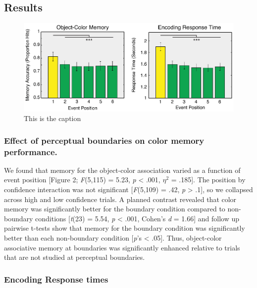 \subsection{Results}\label{results}

\begin{figure}[htbp]
\centering
\includegraphics{figures/chapter1_figure2}
\caption{This is the caption}
\end{figure}

\subsubsection{Effect of perceptual boundaries on color memory
performance.}\label{effect-of-perceptual-boundaries-on-color-memory-performance.}

We found that memory for the object-color association varied as a
function of event position {[}Figure 2; \emph{F}(5,115) = 5.23, \emph{p}
\textless{} .001, \(\eta^{2}\) = .185{]}. The position by confidence
interaction was not significant {[}\emph{F}(5,109) = .42, \emph{p}
\textgreater{} .1{]}, so we collapsed across high and low confidence
trials. A planned contrast revealed that color memory was significantly
better for the boundary condition compared to non-boundary conditions
{[}\emph{t}(23) = 5.54, \emph{p} \textless{} .001, Cohen's \emph{d} =
1.66{]} and follow up pairwise t-tests show that memory for the boundary
condition was significantly better than each non-boundary condition
{[}\emph{p}'s \textless{} .05{]}. Thus, object-color associative memory
at boundaries was significantly enhanced relative to trials that are not
studied at perceptual boundaries.

\subsubsection{Encoding Response times}\label{encoding-response-times}

